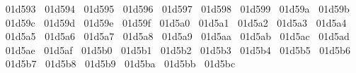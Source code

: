{  ^^^^^^01d593%
  ^^^^^^01d594%
  ^^^^^^01d595%
  ^^^^^^01d596%
  ^^^^^^01d597%
  ^^^^^^01d598%
  ^^^^^^01d599%
  ^^^^^^01d59a%
  ^^^^^^01d59b%
  ^^^^^^01d59c%
  ^^^^^^01d59d%
  ^^^^^^01d59e%
  ^^^^^^01d59f%
  ^^^^^^01d5a0%
  ^^^^^^01d5a1%
  ^^^^^^01d5a2%
  ^^^^^^01d5a3%
  ^^^^^^01d5a4%
  ^^^^^^01d5a5%
  ^^^^^^01d5a6%
  ^^^^^^01d5a7%
  ^^^^^^01d5a8%
  ^^^^^^01d5a9%
  ^^^^^^01d5aa%
  ^^^^^^01d5ab%
  ^^^^^^01d5ac%
  ^^^^^^01d5ad%
  ^^^^^^01d5ae%
  ^^^^^^01d5af%
  ^^^^^^01d5b0%
  ^^^^^^01d5b1%
  ^^^^^^01d5b2%
  ^^^^^^01d5b3%
  ^^^^^^01d5b4%
  ^^^^^^01d5b5%
  ^^^^^^01d5b6%
  ^^^^^^01d5b7%
  ^^^^^^01d5b8%
  ^^^^^^01d5b9%
  ^^^^^^01d5ba%
  ^^^^^^01d5bb%
  ^^^^^^01d5bc%
}
